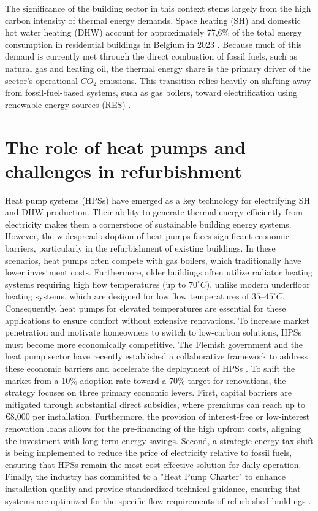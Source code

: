 \documentclass[11pt,a4paper]{report}
\begin{document}
The significance of the building sector in this context stems largely from the high carbon intensity of thermal energy demands.
Space heating (SH) and domestic hot water heating (DHW) account for approximately 77,6\% of the total energy consumption in residential buildings in Belgium in 2023 \cite{Eurostat_Energy_Consumption_2023}.
Because much of this demand is currently met through the direct combustion of fossil fuels, such as natural gas and heating oil, the thermal energy share is the primary driver of the sector's operational $CO_2$ emissions.
This transition relies heavily on shifting away from fossil-fuel-based systems, such as gas boilers, toward electrification using renewable energy sources (RES) \cite{EnergyVille_PATHS2050_Residential_2025} \cite{Esen2006}.

\section{The role of heat pumps and challenges in refurbishment}
Heat pump systems (HPSs) have emerged as a key technology for electrifying SH and DHW production\cite{Esen2006}.
Their ability to generate thermal energy efficiently from electricity makes them a cornerstone of sustainable building energy systems.
However, the widespread adoption of heat pumps faces significant economic barriers, particularly in the refurbishment of existing buildings.
In these scenarios, heat pumps often compete with gas boilers, which traditionally have lower investment costs.
Furthermore, older buildings often utilize radiator heating systems requiring high flow temperatures (up to $70^{\circ}C$), unlike modern underfloor heating systems, which are designed for low flow temperatures of $35$--$45^{\circ}C$\cite{Oubenmoh2018}.
Consequently, heat pumps for elevated temperatures are essential for these applications to ensure comfort without extensive renovations.
To increase market penetration and motivate homeowners to switch to low-carbon solutions, HPSs must become more economically competitive. The Flemish government and the heat pump sector have recently established a 
collaborative framework to address these economic barriers and accelerate 
the deployment of HPSs \cite{VEKA2026}.
To shift the market from a 10\% adoption rate toward a 70\% target for 
renovations, the strategy focuses on three primary economic levers.
First, capital barriers are mitigated through substantial direct subsidies, 
where premiums can reach up to €8,000 per installation.
Furthermore, the provision of interest-free or low-interest renovation 
loans allows for the pre-financing of the high upfront costs, aligning 
the investment with long-term energy savings.
Second, a strategic energy tax shift is being implemented to reduce the 
price of electricity relative to fossil fuels, ensuring that HPSs remain 
the most cost-effective solution for daily operation.
Finally, the industry has committed to a "Heat Pump Charter" to enhance 
installation quality and provide standardized technical guidance, ensuring 
that systems are optimized for the specific flow requirements of 
refurbished buildings \cite{VEKA2026}.
\end{document}
